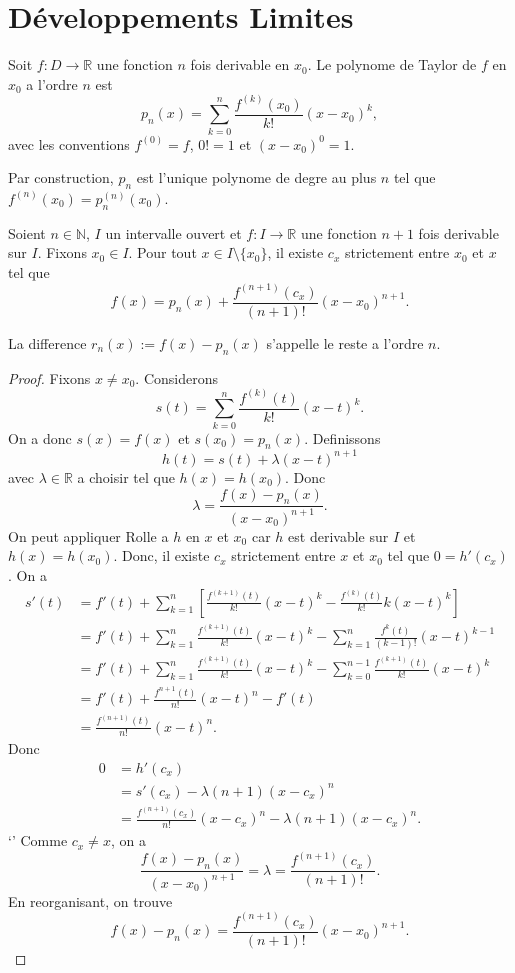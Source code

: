 \chapter{Développements Limites}
\begin{definition}
Soit $f:D\to \mathbb{R}$ une fonction $n$ fois derivable en $x_{0}$. Le polynome de Taylor de $f$ en $x_{0}$ a l'ordre $n$ est
$$
p_{n}(x)=\sum_{k=0}^{n}  \frac{f^{(k)}(x_{0})}{k!}(x-x_{0})^{k},
$$
avec les conventions $f^{(0)}=f$, $0! =1$ et $(x-x_{0})^{0}=1$.
\end{definition}
\begin{remark}
Par construction, $p_{n}$ est l'unique polynome de degre au plus $n$ tel que $f^{(n)}(x_{0})=p_{n}^{(n)}(x_{0})$.
\end{remark}
\begin{theorem}
Soient $n\in \mathbb{N}$, $I$ un intervalle ouvert et $f:I\to \mathbb{R}$ une fonction $n+1$ fois derivable sur $I$. Fixons $x_{0}\in I$. Pour tout $x \in I\setminus \{ x_{0} \}$, il existe $c_{x}$ strictement entre $x_{0}$ et $x$ tel que
$$
f(x)=p_{n}(x)+\frac{f^{(n+1)}(c_{x})}{(n+1)!}(x-x_{0})^{n+1}.
$$
\end{theorem}
\begin{remark}
La difference $r_{n}(x):=f(x)-p_{n}(x)$ s'appelle le reste a l'ordre $n$.
\end{remark}
\begin{proof}
Fixons $x\neq x_{0}$. Considerons
$$
s(t)=\sum_{k=0}^{n}  \frac{f^{(k)}(t)}{k!}(x-t)^{k}.
$$
On a donc $s(x)=f(x)$ et $s(x_{0})=p_{n}(x)$. Definissons
$$
h(t)=s(t)+\lambda(x-t)^{n+1}
$$
avec $\lambda \in \mathbb{R}$ a choisir tel que $h(x)=h(x_{0})$. Donc
$$
\lambda= \frac{f(x)-p_{n}(x)}{(x-x_{0})^{n+1}}.
$$
On peut appliquer Rolle a $h$ en $x$ et $x_{0}$ car $h$ est derivable sur $I$ et $h(x)=h(x_{0})$. Donc, il existe $c_{x}$ strictement entre $x$ et $x_{0}$ tel que $0=h'(c_{x})$. On a
\begin{align*}
s'(t) & =f'(t)+\sum_{k=1}^{n} \left[ \frac{f^{(k+1)}(t)}{k!}(x-t)^{k}-\frac{f^{(k)}(t)}{k!}k(x-t)^{k} \right] \\
 & =f'(t)+\sum_{k=1}^{n} \frac{f^{(k+1)}(t)}{k!}(x-t)^{k}-\sum_{k=1}^{n} \frac{f^{k}(t)}{(k-1)!}(x-t)^{k-1} \\
 &  = f'(t)+\sum_{k=1}^{n}  \frac{f^{(k+1)}(t)}{k!}(x-t)^{k}-\sum_{k=0}^{n-1} \frac{f^{(k+1)}(t)}{k!}(x-t)^{k} \\
 &   =f'(t)+\frac{f^{n+1}(t)}{n!}(x-t)^{n}-f'(t) \\
 &   = \frac{f^{(n+1)}(t)}{n!}(x-t)^{n}.
\end{align*}
Donc
\begin{align*}
0 & =h'(c_{x}) \\
 & =s'(c_{x})-\lambda(n+1)(x-c_{x})^{n} \\
 &  = \frac{f^{(n+1)}(c_{x})}{n!}(x-c_{x})^{n}-\lambda(n+1)(x-c_{x})^{n}.
\end{align*}`'
Comme $c_{x}\neq x$, on a
$$
\frac{f(x)-p_{n}(x)}{(x-x_{0})^{n+1}}=\lambda=\frac{f^{(n+1)}(c_{x})}{(n+1)!}.
$$
En reorganisant, on trouve
$$
f(x)-p_{n}(x)=\frac{f^{(n+1)}(c_{x})}{(n+1)!}(x-x_{0})^{n+1}.
$$
\end{proof}
